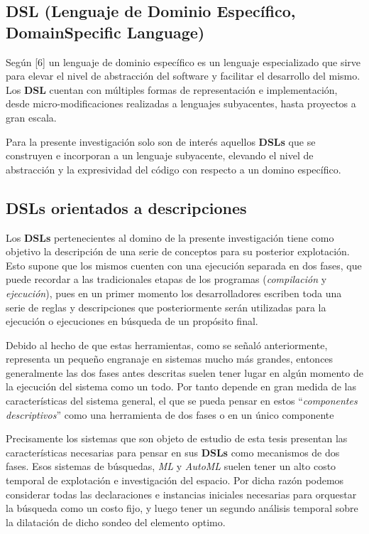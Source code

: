 \subsection{DSL (Lenguaje de Dominio Específico, Domain\newline Specific Language)}

Según [6] un lenguaje de dominio específico es un lenguaje especializado que sirve
para elevar el nivel de abstracción del software y facilitar el desarrollo del mismo.
Los {\bf DSL} cuentan con múltiples formas de representación e implementación, desde
micro-modificaciones realizadas a lenguajes subyacentes, hasta proyectos a gran escala.

Para la presente investigación solo son de interés aquellos {\bf DSLs} que se construyen e
incorporan a un lenguaje subyacente, elevando el nivel de abstracción y la expresividad
del código con respecto a un domino específico.

\subsection{DSLs orientados a descripciones}

Los {\bf DSLs} pertenecientes al domino de la presente investigación tiene como objetivo
la descripción de una serie de conceptos para su posterior explotación. Esto supone que
los mismos cuenten con una ejecución separada en dos fases, que puede recordar a las
tradicionales etapas de los programas ({\it compilación} y {\it ejecución}), pues en un
primer momento los desarrolladores escriben toda una serie de reglas y descripciones
que posteriormente serán utilizadas para la ejecución o ejecuciones en búsqueda de un
propósito final.

Debido al hecho de que estas herramientas, como se señaló anteriormente, representa un
pequeño engranaje en sistemas mucho más grandes, entonces generalmente las dos fases
antes descritas suelen tener lugar en algún momento de la ejecución del sistema como un
todo. Por tanto depende en gran medida de las características del sistema general, el
que se pueda pensar en estos ``{\it componentes descriptivos}'' como una herramienta de dos
fases o en un único componente

Precisamente los sistemas que son objeto de estudio de esta tesis presentan las
características necesarias para pensar en sus {\bf DSLs} como mecanismos de dos fases.
Esos sistemas de búsquedas, {\it ML} y {\it AutoML} suelen tener un alto costo temporal de
explotación e investigación del espacio. Por dicha razón podemos considerar todas las
declaraciones e instancias iniciales necesarias para orquestar la búsqueda como un
costo fijo, y luego tener un segundo análisis temporal sobre la dilatación de dicho
sondeo del elemento optimo.

